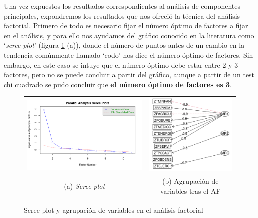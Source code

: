\documentclass[letterpaper,11pt]{article}
\begin{document}
Una vez expuestos los resultados correspondientes al análisis de componentes principales, expondremos los resultados que nos ofreció la técnica del análisis factorial. Primero de todo es necesario fijar el número óptimo de factores a fijar en el análisis, y para ello nos ayudamos del gráfico conocido en la literatura como `\textit{scree plot}' (figura \ref{AF} (a)), donde el número de puntos antes de un cambio en la tendencia comúnmente llamado `codo' nos dice el número óptimo de factores. Sin embargo, en este caso se intuye que el número óptimo debe estar entre 2 y 3 factores, pero no se puede concluir a partir del gráfico, aunque a partir de un test chi cuadrado se pudo concluir que \textbf{el número óptimo de factores es 3}.

\begin{figure}
\begin{tabular}{cc}
  \includegraphics[scale=0.4]{./img/codo.png} &   \includegraphics[scale=0.5]{./img/AF.png} \\
(a) \textit{Scree plot} & (b) Agrupación de variables tras el AF \\[6pt]
\end{tabular}
\caption{Scree plot y agrupación de variables en el análisis factorial}
\label{AF}
\end{figure}
\end{document}
